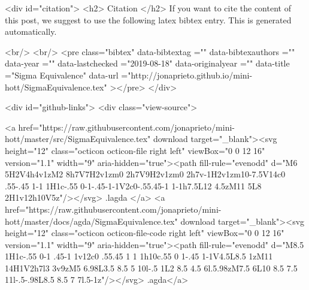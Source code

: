  
  <div id="citation">
  <h2> Citation </h2>
  If you want to cite the content of this post,
  we suggest to use the following latex bibtex entry.
  This is generated automatically.

  <br/>
  <br/>
  <pre class="bibtex"
       data-bibtextag =""
       data-bibtexauthors =""
       data-year =""
       data-lastchecked ="2019-08-18"
       data-originalyear =""
       data-title ="Sigma Equivalence"
       data-url ="http://jonaprieto.github.io/mini-hott/SigmaEquivalence.tex"
  ></pre>
  </div>
  

  <div id="github-links">
    <div class="view-source">
      
        <a href="https://raw.githubusercontent.com/jonaprieto/mini-hott/master/src/SigmaEquivalence.tex" download target="_blank"><svg height="12" class="octicon octicon-file right left" viewBox="0 0 12 16" version="1.1" width="9" aria-hidden="true"><path fill-rule="evenodd" d="M6 5H2V4h4v1zM2 8h7V7H2v1zm0 2h7V9H2v1zm0 2h7v-1H2v1zm10-7.5V14c0 .55-.45 1-1 1H1c-.55 0-1-.45-1-1V2c0-.55.45-1 1-1h7.5L12 4.5zM11 5L8 2H1v12h10V5z"/></svg> .lagda </a>
        <a href="https://raw.githubusercontent.com/jonaprieto/mini-hott/master/docs/agda/SigmaEquivalence.tex" download target="_blank"><svg height="12" class="octicon octicon-file-code right left" viewBox="0 0 12 16" version="1.1" width="9" aria-hidden="true"><path fill-rule="evenodd" d="M8.5 1H1c-.55 0-1 .45-1 1v12c0 .55.45 1 1 1h10c.55 0 1-.45 1-1V4.5L8.5 1zM11 14H1V2h7l3 3v9zM5 6.98L3.5 8.5 5 10l-.5 1L2 8.5 4.5 6l.5.98zM7.5 6L10 8.5 7.5 11l-.5-.98L8.5 8.5 7 7l.5-1z"/></svg> .agda</a>
      

